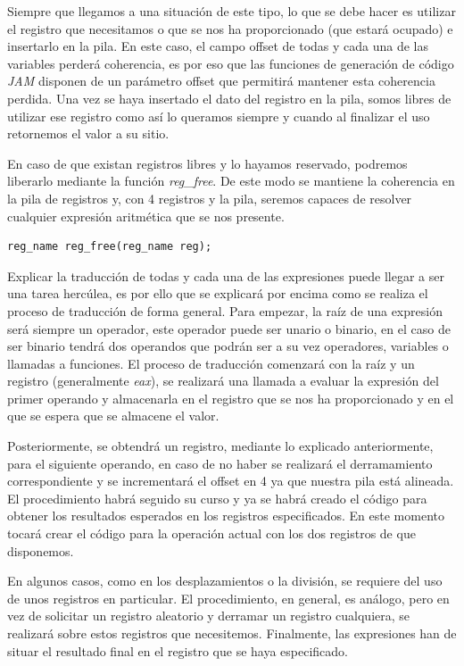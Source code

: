 \documentclass[a4paper,10pt]{article}
\begin{document}
Siempre que llegamos a una situación de este tipo, lo que se debe hacer es utilizar el registro que necesitamos o que se nos ha proporcionado (que estará ocupado) e insertarlo en la pila. En este caso, el campo offset de todas y cada una de las variables perderá coherencia, es por eso que las funciones de generación de código \textit{JAM} disponen de un parámetro offset que permitirá mantener esta coherencia perdida. Una vez se haya insertado el dato del registro en la pila, somos libres de utilizar ese registro como así lo queramos siempre y cuando al finalizar el uso retornemos el valor a su sitio.

En caso de que existan registros libres y lo hayamos reservado, podremos liberarlo mediante la función \textit{reg\_free}. De este modo se mantiene la coherencia en la pila de registros y, con 4 registros y la pila, seremos capaces de resolver cualquier expresión aritmética que se nos presente.
\begin{lstlisting}
reg_name reg_free(reg_name reg);
\end{lstlisting}

Explicar la traducción de todas y cada una de las expresiones puede llegar a ser una tarea hercúlea, es por ello que se explicará por encima como se realiza el proceso de traducción de forma general. Para empezar, la raíz de una expresión será siempre un operador, este operador puede ser unario o binario, en el caso de ser binario tendrá dos operandos que podrán ser a su vez operadores, variables o llamadas a funciones. El proceso de traducción comenzará con la raíz y un registro (generalmente \textit{eax}), se realizará una llamada a evaluar la expresión del primer operando y almacenarla en el registro que se nos ha proporcionado y en el que se espera que se almacene el valor. 

Posteriormente, se obtendrá un registro, mediante lo explicado anteriormente, para el siguiente operando, en caso de no haber se realizará el derramamiento correspondiente y se incrementará el offset en 4 ya que nuestra pila está alineada. El procedimiento habrá seguido su curso y ya se habrá creado el código para obtener los resultados esperados en los registros especificados. En este momento tocará crear el código para la operación actual con los dos registros de que disponemos.

En algunos casos, como en los desplazamientos o la división, se requiere del uso de unos registros en particular. El procedimiento, en general, es análogo, pero en vez de solicitar un registro aleatorio y derramar un registro cualquiera, se realizará sobre estos registros que necesitemos. Finalmente, las expresiones han de situar el resultado final en el registro que se haya especificado.
\end{document}
